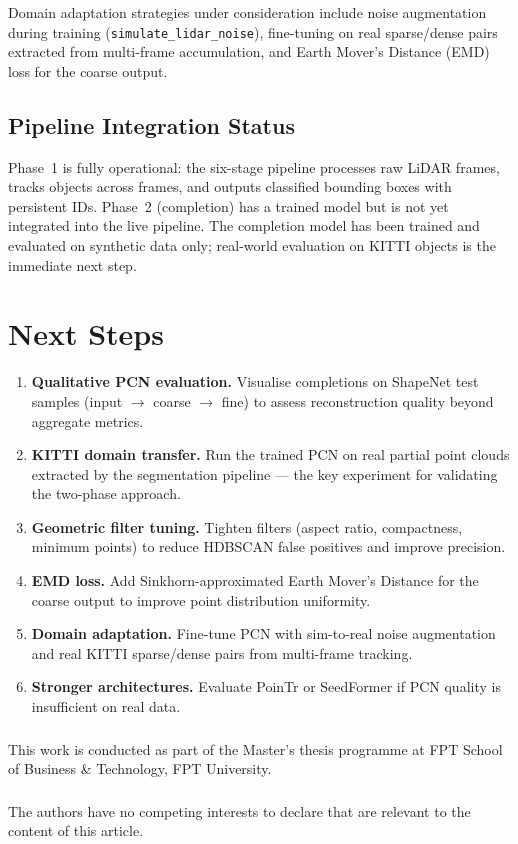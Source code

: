 \documentclass[runningheads]{llncs}
\begin{document}
Domain adaptation strategies under consideration include noise augmentation during training (\texttt{simulate\_lidar\_noise}), fine-tuning on real sparse/dense pairs extracted from multi-frame accumulation, and Earth Mover's Distance (EMD) loss for the coarse output.

\subsection{Pipeline Integration Status}

Phase~1 is fully operational: the six-stage pipeline processes raw LiDAR frames, tracks objects across frames, and outputs classified bounding boxes with persistent IDs. Phase~2 (completion) has a trained model but is not yet integrated into the live pipeline. The completion model has been trained and evaluated on synthetic data only; real-world evaluation on KITTI objects is the immediate next step.


\section{Next Steps}

\begin{enumerate}
    \item \textbf{Qualitative PCN evaluation.} Visualise completions on ShapeNet test samples (input $\to$ coarse $\to$ fine) to assess reconstruction quality beyond aggregate metrics.
    \item \textbf{KITTI domain transfer.} Run the trained PCN on real partial point clouds extracted by the segmentation pipeline --- the key experiment for validating the two-phase approach.
    \item \textbf{Geometric filter tuning.} Tighten filters (aspect ratio, compactness, minimum points) to reduce HDBSCAN false positives and improve precision.
    \item \textbf{EMD loss.} Add Sinkhorn-approximated Earth Mover's Distance for the coarse output to improve point distribution uniformity.
    \item \textbf{Domain adaptation.} Fine-tune PCN with sim-to-real noise augmentation and real KITTI sparse/dense pairs from multi-frame tracking.
    \item \textbf{Stronger architectures.} Evaluate PoinTr or SeedFormer if PCN quality is insufficient on real data.
\end{enumerate}


\begin{credits}
\subsubsection{\ackname}
This work is conducted as part of the Master's thesis programme at FPT School of Business \& Technology, FPT University.

\subsubsection{\discintname}
The authors have no competing interests to declare that are relevant to the content of this article.
\end{credits}



\end{document}
